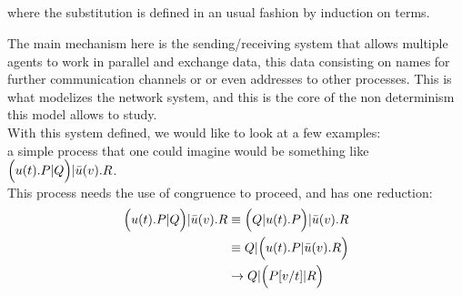 \begin{definition}
\begin{prooftree}\end{prooftree}\hfill~\\~\\
\begin{prooftree}\end{prooftree}\hfill
\begin{prooftree}\end{prooftree}\hfill
\begin{prooftree}\end{prooftree}\\~\\
where the substitution is defined in an usual fashion by induction on terms.
\end{definition}

The main mechanism here is the sending/receiving system that allows multiple agents to work in parallel and exchange data, this data consisting on names for further communication channels or or even addresses to other processes. This is what modelizes the network system, and this is the core of the non determinism this model allows to study.\\

With this system defined, we would like to look at a few examples:\\

\example a simple process that one could imagine would be something like $\Bigl(u(t).P|Q\Bigr)|\bar{u}(v).R$.\\
This process needs the use of congruence to proceed, and has one reduction:
\begin{align*}
\Bigl(u(t).P|Q\Bigr)|\bar{u}(v).R &\equiv \Bigl(Q|u(t).P\Bigr)|\bar{u}(v).R\\
&\equiv Q|\Bigl(u(t).P|\bar{u}(v).R\Bigr)\\
&\to Q|\Bigl(P[v/t]|R\Bigr)
\end{align*}

